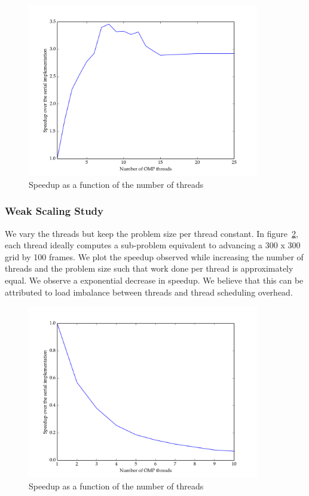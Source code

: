 \documentclass[11pt]{article}
\begin{document}
\begin{figure}[H]
    \includegraphics[width=0.9\textwidth]{./strong_scaling/strong_scaling.png}
    \caption{Speedup as a function of the number of threads}
    \label{fig:strong_scaling}
\end{figure} 


\subsubsection{Weak Scaling Study}

We vary the threads but keep the problem size per thread constant. In figure~\ref{fig:weak_scaling}, each thread ideally computes a sub-problem equivalent to advancing a 300 x 300 grid by 100 frames. We 
plot the speedup observed while increasing the number of threads and the problem size such that work done per thread is approximately equal. We observe a exponential decrease in speedup. We believe that this can be attributed to load imbalance between threads and thread scheduling overhead. 

 \begin{figure}[H]
    \includegraphics[width=0.9\textwidth]{./weak_scaling/weak_scaling.png}
    \caption{Speedup as a function of the number of threads}
    \label{fig:weak_scaling}
\end{figure} 
\end{document}
